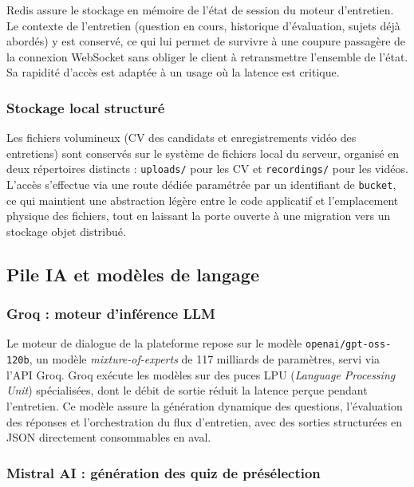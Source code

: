 Redis assure le stockage en mémoire de l'état de session du moteur d'entretien. Le contexte de l'entretien (question en cours, historique d'évaluation, sujets déjà abordés) y est conservé, ce qui lui permet de survivre à une coupure passagère de la connexion WebSocket sans obliger le client à retransmettre l'ensemble de l'état. Sa rapidité d'accès est adaptée à un usage où la latence est critique.


\subsubsection{Stockage local structuré}

Les fichiers volumineux (CV des candidats et enregistrements vidéo des entretiens) sont conservés sur le système de fichiers local du serveur, organisé en deux répertoires distincts : \texttt{uploads/} pour les CV et \texttt{recordings/} pour les vidéos. L'accès s'effectue via une route dédiée paramétrée par un identifiant de \texttt{bucket}, ce qui maintient une abstraction légère entre le code applicatif et l'emplacement physique des fichiers, tout en laissant la porte ouverte à une migration vers un stockage objet distribué.

\subsection{Pile IA et modèles de langage}

\subsubsection{Groq : moteur d'inférence LLM}

Le moteur de dialogue de la plateforme repose sur le modèle \texttt{openai/gpt-oss-120b}, un modèle \textit{mixture-of-experts} de 117 milliards de paramètres, servi via l'API Groq. Groq exécute les modèles sur des puces LPU (\textit{Language Processing Unit}) spécialisées, dont le débit de sortie réduit la latence perçue pendant l'entretien. Ce modèle assure la génération dynamique des questions, l'évaluation des réponses et l'orchestration du flux d'entretien, avec des sorties structurées en JSON directement consommables en aval.


\subsubsection{Mistral AI : génération des quiz de présélection}

